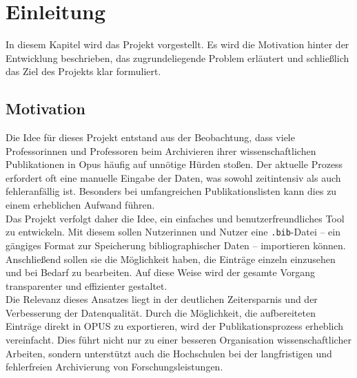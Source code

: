 \chapter{Einleitung}
In diesem Kapitel wird das Projekt vorgestellt. Es wird die Motivation 
hinter der Entwicklung beschrieben, das zugrundeliegende Problem erläutert
und schließlich das Ziel des Projekts klar formuliert. 

\section{Motivation}
Die Idee für dieses Projekt entstand aus der Beobachtung, dass viele 
Professorinnen und Professoren beim Archivieren ihrer wissenschaftlichen 
Publikationen in Opus häufig auf unnötige Hürden stoßen. Der aktuelle Prozess 
erfordert oft eine manuelle Eingabe der Daten, was sowohl zeitintensiv 
als auch fehleranfällig ist. Besonders bei umfangreichen Publikationslisten 
kann dies zu einem erheblichen Aufwand führen.\\

\noindent Das Projekt verfolgt daher die Idee, ein einfaches und 
benutzerfreundliches Tool zu entwickeln. Mit diesem sollen Nutzerinnen und 
Nutzer eine \texttt{.bib}-Datei – ein gängiges Format zur Speicherung 
bibliographischer Daten – importieren können. Anschließend sollen sie die 
Möglichkeit haben, die Einträge einzeln einzusehen und bei Bedarf zu 
bearbeiten. Auf diese Weise wird der gesamte Vorgang transparenter und 
effizienter gestaltet.\\

\noindent Die Relevanz dieses Ansatzes liegt in der deutlichen Zeitersparnis und der 
Verbesserung der Datenqualität. Durch die Möglichkeit, die aufbereiteten 
Einträge direkt in OPUS zu exportieren, wird der Publikationsprozess 
erheblich vereinfacht. Dies führt nicht nur zu einer besseren Organisation 
wissenschaftlicher Arbeiten, sondern unterstützt auch die Hochschulen bei 
der langfristigen und fehlerfreien Archivierung von Forschungsleistungen.

